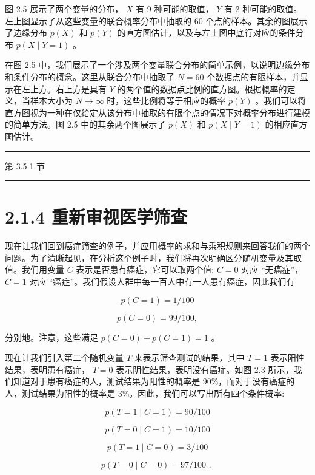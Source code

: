 \documentclass[10pt]{article}
\newcommand{\HRule}{\begin{center}\rule{0.9\linewidth}{0.2mm}\end{center}}
\begin{document}
图 2.5 展示了两个变量的分布， \(X\) 有 9 种可能的取值， \(Y\) 有 2 种可能的取值。左上图显示了从这些变量的联合概率分布中抽取的 60 个点的样本。其余的图展示了边缘分布 \(p\left( X\right)\) 和 \(p\left( Y\right)\) 的直方图估计，以及与左上图中底行对应的条件分布 \(p\left( {X \mid  Y = 1}\right)\) 。

在图 2.5 中，我们展示了一个涉及两个变量联合分布的简单示例，以说明边缘分布和条件分布的概念。这里从联合分布中抽取了 \(N = {60}\) 个数据点的有限样本，并显示在左上方。右上方是具有 \(Y\) 的两个值的数据点比例的直方图。根据概率的定义，当样本大小为 \(N \rightarrow  \infty\) 时，这些比例将等于相应的概率 \(p\left( Y\right)\) 。我们可以将直方图视为一种在仅给定从该分布中抽取的有限个点的情况下对概率分布进行建模的简单方法。图 2.5 中的其余两个图展示了 \(p\left( X\right)\) 和 \(p\left( {X \mid  Y = 1}\right)\) 的相应直方图估计。

\HRule

第 3.5.1 节

\HRule

\section*{2.1.4 重新审视医学筛查}

现在让我们回到癌症筛查的例子，并应用概率的求和与乘积规则来回答我们的两个问题。为了清晰起见，在分析这个例子时，我们将再次明确区分随机变量及其取值。我们用变量 \(C\) 表示是否患有癌症，它可以取两个值: \(C = 0\) 对应 “无癌症”， \(C = 1\) 对应 “癌症”。我们假设人群中每一百人中有一人患有癌症，因此我们有

\[
p\left( {C = 1}\right)  = 1/{100} \tag{2.12}
\]

\[
p\left( {C = 0}\right)  = {99}/{100}, \tag{2.13}
\]

分别地。注意，这些满足 \(p\left( {C = 0}\right)  + p\left( {C = 1}\right)  = 1\) 。

现在让我们引入第二个随机变量 \(T\) 来表示筛查测试的结果，其中 \(T = 1\) 表示阳性结果，表明患有癌症， \(T = 0\) 表示阴性结果，表明没有癌症。如图 2.3 所示，我们知道对于患有癌症的人，测试结果为阳性的概率是 90\%，而对于没有癌症的人，测试结果为阳性的概率是 3\%。因此，我们可以写出所有四个条件概率:

\[
p\left( {T = 1 \mid  C = 1}\right)  = {90}/{100} \tag{2.14}
\]

\[
p\left( {T = 0 \mid  C = 1}\right)  = {10}/{100} \tag{2.15}
\]

\[
p\left( {T = 1 \mid  C = 0}\right)  = 3/{100} \tag{2.16}
\]

\[
p\left( {T = 0 \mid  C = 0}\right)  = {97}/{100}\text{ . } \tag{2.17}
\]
\end{document}
